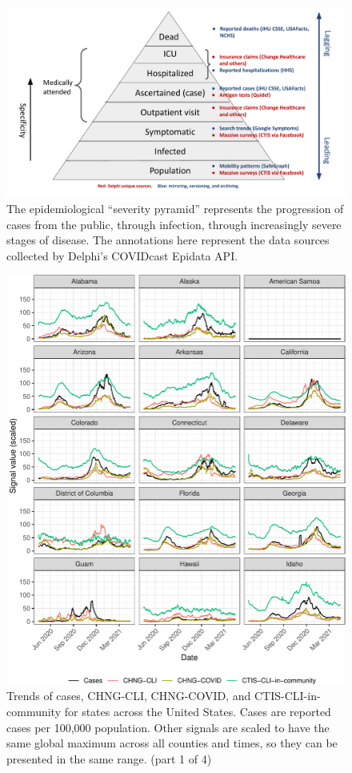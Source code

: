 
\begin{figure}
\includegraphics[width=\textwidth]{fig/severity-pyramid.pdf}
\caption{The epidemiological ``severity pyramid'' represents the progression of
cases from the public, through infection, through increasingly severe stages of
disease. The annotations here represent the data sources collected by Delphi's
COVIDcast Epidata API.}
\end{figure}

\clearpage

\begin{figure}

{\centering \includegraphics[width=\textwidth]{fig/state-trend-grids-1-1}

}

\caption{Trends of cases, CHNG-CLI, CHNG-COVID, and CTIS-CLI-in-community for states across the United States. Cases are reported cases per 100,000 population. Other signals are scaled to have the same global maximum across all counties and times, so they can be presented in the same range. (part 1 of 4)}\label{fig:state-trend-grids-1}
\end{figure}

